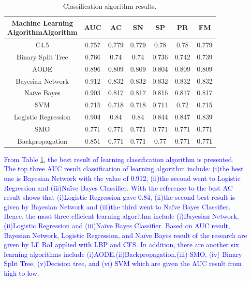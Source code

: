 \documentclass[review]{elsarticle}
\begin{document}
\begin{table}[h!]
	\centering
	\begin{tabular}{|c|c|c|c|c|c|c|}
		\hline 
		\backslashbox{Machine Learning \\ Algorithm}{Algorithm} &AUC&AC&SN&SP&PR&FM\\
		\hline  
		C4.5		& 0.757 &	0.779 &	0.779 &	0.78 &	0.78 &	0.779\\
		\hline
		Binary Split Tree	& 0.766	& 0.74	& 0.74	& 0.736	& 0.742	& 0.739 \\
		\hline 
		AODE	& 0.896	& 0.809	& 0.809	& 0.804	& 0.809	& 0.809 \\
		\hline 
	\cellcolor{blue!25}	Bayesian Network	& \cellcolor{blue!25}0.912	& \cellcolor{blue!25}0.832	& \cellcolor{blue!25}0.832	& \cellcolor{blue!25}0.832	& \cellcolor{blue!25}0.832	& \cellcolor{blue!25}0.832\\
		\hline 
		Na\"ive Bayes	& 0.903	& 0.817	& 0.817	& 0.816	& 0.817	& 0.817 \\
		\hline 
		SVM			& 0.715	& 0.718	& 0.718	& 0.711	& 0.72	& 0.715 \\
		\hline 
		Logistic Regression	& 0.904	& 0.84	& 0.84	& 0.844	& 0.847	& 0.839 \\
		\hline 
		SMO			& 0.771	& 0.771	& 0.771	& 0.771	& 0.771	& 0.771 \\
		\hline 
		Backpropagation	& 0.851	& 0.771	& 0.771	& 0.77	& 0.771	& 0.771 \\
		\hline 
	\end{tabular} 
	\caption{Classification algorithm results.}
	\label{tab:AlgorithmResult}
\end{table}
\textcolor{blue}{
From Table \ref{tab:AlgorithmResult}, the best result of learning classification algorithm is presented. The top three AUC result classification of learning algorithm include: (i)the best one is Bayesian Network with the value of 0.912, (ii)the second went to Logistic Regression and (iii)Na\"ive Bayes Classifier. With the reference to the best AC result shows that (i)Logistic Regression gave 0.84, (ii)the second best result is given by Bayesian Network and (iii)the third went to Na\"ive Bayes Classifier. Hence, the most three efficient learning algorithm include (i)Bayesian Network, (ii)Logistic Regression and (iii)Na\"ive Bayes Classifier. Based on AUC result, Bayesian Network, Logistic Regression, and Na\"ive Bayes result of the research are given by LF RoI applied with LBP and CFS. In addition, there are another six learning algorithms include (i)AODE,(ii)Backpropagation,(iii) SMO, (iv) Binary Split Tree, (v)Decision tree, and (vi) SVM which are given the AUC result from high to low. 
}
\end{document}
